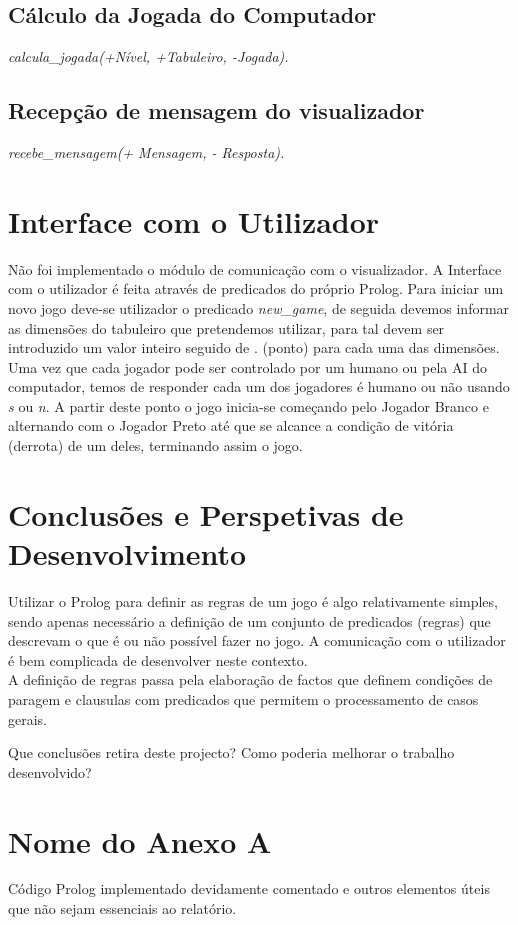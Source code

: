 \documentclass[15pt,a4paper]{article}
\begin{document}
\subsection{Cálculo da Jogada do Computador}\textit{calcula\_jogada(+Nível, +Tabuleiro, -Jogada).}
\subsection{Recepção de mensagem do visualizador}\textit{recebe\_mensagem(+ Mensagem, - Resposta).}

\section{Interface com o Utilizador}
Não foi implementado o módulo de comunicação com o visualizador. A Interface com o utilizador é feita através de predicados do próprio Prolog.
Para iniciar um novo jogo deve-se utilizador o predicado \textit{new_game}, de seguida devemos informar as dimensões do tabuleiro que pretendemos utilizar, para tal devem ser introduzido um valor inteiro seguido de . (ponto) para cada uma das dimensões.
Uma vez que cada jogador pode ser controlado por um humano ou pela AI do computador, temos de responder cada um dos jogadores é humano ou não usando \textit{s} ou \textit{n}.
A partir deste ponto o jogo inicia-se começando pelo Jogador Branco e alternando com o Jogador Preto até que se alcance a condição de vitória (derrota) de um deles, terminando assim o jogo.

\section{Conclusões e Perspetivas de Desenvolvimento}
Utilizar o Prolog para definir as regras de um jogo é algo relativamente simples, sendo apenas necessário a definição de um conjunto de predicados (regras) que descrevam o que é ou não possível fazer no jogo. A comunicação com o utilizador é bem complicada de desenvolver neste contexto.
\\
A definição de regras passa pela elaboração de factos que definem condições de paragem e clausulas com predicados que permitem o processamento de casos gerais.


Que conclusões  retira deste projecto? Como poderia melhorar o trabalho desenvolvido?

\clearpage
{}
\renewcommand\refname{Bibliografia}



\listoffigures

\newpage
\appendix
\section{Nome do Anexo A}
Código Prolog implementado devidamente comentado e outros elementos úteis que não sejam essenciais ao relatório.
\end{document}
